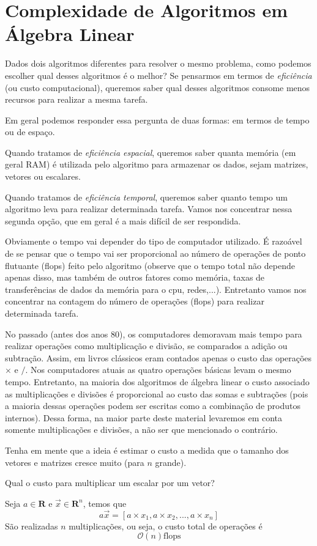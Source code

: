 \section{Complexidade de Algoritmos em Álgebra Linear}
Dados dois algoritmos diferentes para resolver o mesmo problema, como podemos escolher qual desses algoritmos é o melhor? Se pensarmos em termos de \emph{eficiência} (ou custo computacional), queremos saber qual desses algoritmos consome menos recursos para realizar a mesma tarefa.

Em geral podemos responder essa pergunta de duas formas: em termos de tempo ou de espaço.

Quando tratamos de \emph{eficiência espacial}, queremos saber quanta memória (em geral RAM) é utilizada pelo algoritmo para armazenar os dados, sejam matrizes, vetores ou escalares.

Quando tratamos de \emph{eficiência temporal}, queremos saber quanto tempo um algoritmo leva para realizar determinada tarefa. Vamos nos concentrar nessa segunda opção, que em geral é a mais difícil de ser respondida.

Obviamente o tempo vai depender do tipo de computador utilizado. É razoável de se pensar que o tempo vai ser proporcional ao número de operações de ponto flutuante (flops) feito pelo algoritmo (observe que o tempo total não depende apenas disso, mas também de outros fatores como memória, taxas de transferências de dados da memória para o cpu, redes,...). Entretanto vamos nos concentrar na contagem do número de operações (flops) para realizar determinada tarefa.

No passado (antes dos anos 80), os computadores demoravam mais tempo para realizar operações como multiplicação e divisão, se comparados a adição ou subtração. Assim, em livros clássicos eram contados apenas o custo das operações $\times$ e $/$. Nos computadores atuais as quatro operações básicas  levam o mesmo tempo. Entretanto, na maioria dos algoritmos de álgebra linear o custo associado as multiplicações e divisões é proporcional ao custo das somas e subtrações (pois a maioria dessas operações podem ser escritas como a combinação de produtos internos). Dessa forma, na maior parte deste material levaremos em conta somente multiplicações e divisões, a não ser que mencionado o contrário.

Tenha em mente que a ideia é estimar o custo a medida que o tamanho dos vetores e matrizes cresce muito (para $n$ grande).

\begin{ex}
Qual o custo para multiplicar um escalar por um vetor?
\end{ex}
\begin{sol}
Seja $a \in \mathbf{R}$ e $\vec{x} \in \mathbf{R}^n$, temos que
\begin{equation}
  a \vec{x} = [a\times x_1 , a\times x_2 , ... ,a\times x_n]
\end{equation}
São realizadas $n$ multiplicações, ou seja, o custo total de operações é
\begin{equation}
  \mathcal{O}(n) \text{flops}
\end{equation}
\end{sol}

